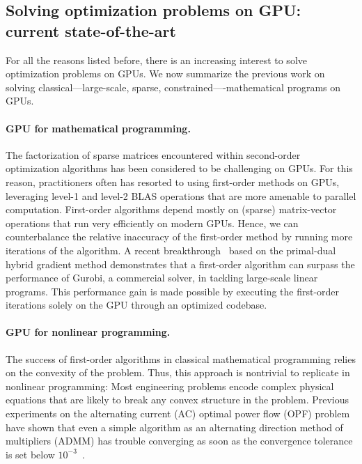 \subsection{Solving optimization problems on GPU: current state-of-the-art} 
For all the reasons listed before, there is an increasing interest to solve optimization problems on GPUs.
We now summarize the previous work on solving classical---large-scale, sparse, constrained----mathematical programs on GPUs.

\paragraph{GPU for mathematical programming.}
The factorization of sparse matrices encountered within second-order optimization algorithms has been considered to be challenging  on GPUs.
For this reason, practitioners often has resorted to using first-order
methods on GPUs, leveraging level-1 and level-2 BLAS operations that
are more amenable to parallel computation.
First-order algorithms depend mostly on (sparse) matrix-vector operations that run
very efficiently on modern GPUs. Hence, we can counterbalance
the relative inaccuracy of the first-order method by running more
iterations of the algorithm.
A recent breakthrough~\cite{lu2023cupdlp,lu2023cupdlp2} based on the primal-dual hybrid gradient method demonstrates
that a first-order algorithm can surpass the performance of Gurobi, a
commercial solver, in tackling large-scale linear programs. This
performance gain is made possible by executing the first-order
iterations solely on the GPU through an optimized codebase.


\paragraph{GPU for nonlinear programming.}
The success of first-order algorithms in classical mathematical programming
relies on the convexity of the problem. Thus, this approach is nontrivial to replicate
in nonlinear programming: Most engineering problems encode complex
physical equations that are likely to break any convex structure in the problem.
Previous experiments on the alternating current (AC) optimal power flow (OPF) problem have shown that even a simple
algorithm as an alternating direction method of multipliers (ADMM) has trouble converging as soon as the convergence
tolerance is set below $10^{-3}$~\cite{kim2021leveraging}.

